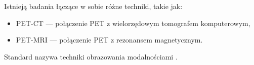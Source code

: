 Istnieją badania łączące w sobie różne techniki, takie jak:
\begin{itemize}
    \item PET-CT --- połączenie PET z wielorzędowym tomografem komputerowym,
    \item PET-MRI --- połączenie PET z rezonansem magnetycznym.
\end{itemize}

Standard \DICOM nazywa techniki obrazowania modalnościami .
